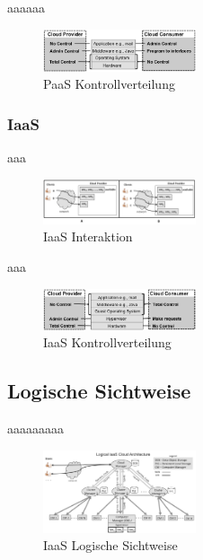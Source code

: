 aaaaaa
\begin{figure}[H]
    \centering
	\includegraphics[width=0.4\textwidth]{Images/PaaSControl}
	\caption{PaaS Kontrollverteilung \cite{Badger}}
	\label{PaaSControl}
\end{figure}

\subsubsection{IaaS}
aaa
\begin{figure}[H]
    \centering
	\includegraphics[width=0.4\textwidth]{Images/IaaSInteraction}
	\caption{IaaS Interaktion \cite{Badger}}
	\label{IaaSInteraction}
\end{figure}

aaa
\begin{figure}[H]
    \centering
	\includegraphics[width=0.4\textwidth]{Images/IaaSControl}
	\caption{IaaS Kontrollverteilung \cite{Badger}}
	\label{IaaSControl}
\end{figure}

\subsection{Logische Sichtweise}
aaaaaaaaa
\begin{figure}[H]
    \centering
	\includegraphics[width=0.4\textwidth]{Images/IaaSLogic}
	\caption{IaaS Logische Sichtweise \cite{Badger}}
	\label{IaaSLogic}
\end{figure}

